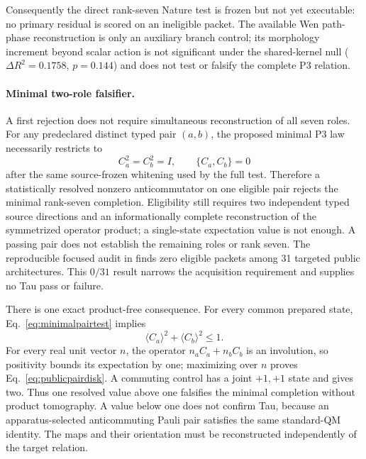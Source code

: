 Consequently the direct rank-seven Nature test is frozen but not yet
executable: no primary residual is scored on an ineligible packet.  The
available Wen path-phase reconstruction is only an auxiliary branch control;
its morphology increment beyond scalar action is not significant under the
shared-kernel null ($\Delta R^2=0.1758$, $p=0.144$) and does not test or
falsify the complete P3 relation.

\paragraph{Minimal two-role falsifier.}
A first rejection does not require simultaneous reconstruction of all seven
roles.  For any predeclared distinct typed pair $(a,b)$, the proposed minimal
P3 law necessarily restricts to
\begin{equation}
 C_a^2=C_b^2=I,
 \qquad
 \{C_a,C_b\}=0
 \label{eq:minimalpairtest}
\end{equation}
after the same source-frozen whitening used by the full test.  Therefore a
statistically resolved nonzero anticommutator on one eligible pair rejects the
minimal rank-seven completion.  Eligibility still requires two independent
typed source directions and an informationally complete reconstruction of the
symmetrized operator product; a single-state expectation value is not enough.
A passing pair does not establish the remaining roles or rank seven.  The
reproducible focused audit in
 finds zero eligible packets
among 31 targeted public architectures. This $0/31$ result narrows the
acquisition requirement and supplies no Tau pass or failure.

There is one exact product-free consequence. For every common prepared state,
Eq.~\eqref{eq:minimalpairtest} implies
\begin{equation}
 \langle C_a\rangle^2+\langle C_b\rangle^2\leq1.
 \label{eq:publicpairdisk}
\end{equation}
For every real unit vector $n$, the operator $n_aC_a+n_bC_b$ is an
involution, so positivity bounds its expectation by one; maximizing over $n$
proves Eq.~\eqref{eq:publicpairdisk}. A commuting control has a joint
$+1,+1$ state and gives two. Thus one resolved value above one falsifies the
minimal completion without product tomography. A value below one does not
confirm Tau, because an apparatus-selected anticommuting Pauli pair satisfies
the same standard-QM identity. The maps and their orientation must be
reconstructed independently of the target relation.

